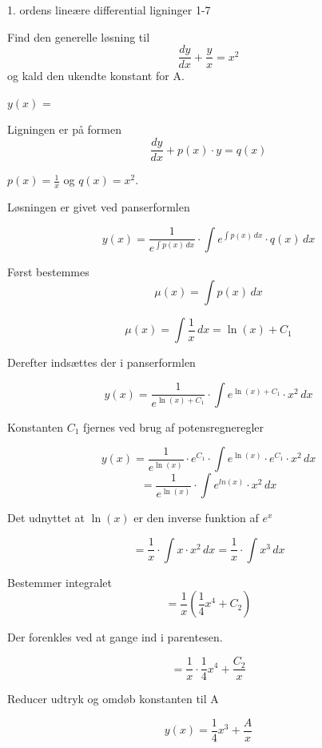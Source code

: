 \documentclass{article}
\begin{document}
\begin{exercise}{1. ordens lineære differential ligninger 1-7}
	
	
	Find den generelle løsning til
	\[
	\frac{dy}{dx} +  \frac{y}{x} = x^2
	\]
	og kald den ukendte konstant for A.
	
	$y(x)$ =   
	
	
	
	\hint
	
	Ligningen er på formen
	\[
	\frac{dy}{dx} + p(x) \cdot y = q(x)
	\]
	
	\hint
	
	$p(x)=\frac{1}{x}$ og $q(x)=x^2$.
	
	\hint
	
	Løsningen er givet ved panserformlen
	
	
	\hint
	
	\[
	y(x) = \frac{1}{e^{\int p(x) \, dx}} \cdot \int e^{\int p(x) \, dx}  \cdot q(x) \, dx
	\]
	
	\hint
	
	Først bestemmes 
	\[
	\mu(x) = \int p(x) \, dx
	\]
	
	\hint
	\[
	\mu(x) = \int \frac{1}{x} \, dx = \ln(x)+ C_1
	\]
	
	\hint
	Derefter indsættes der i  panserformlen
	
	\hint
	
	\[
	y(x) = \frac{1}{e^{\ln(x) + C_1}} \cdot \int e^{\ln(x) + C_1}  \cdot x^2 \, dx
	\]
	
	
	\hint
	
	Konstanten $C_1$ fjernes ved brug af potensregneregler
	
	\hint
	\[
	y(x) = \frac{1}{e^{\ln(x)}} \cdot e^{C_1} \cdot \int e^{\ln(x)} \cdot e^{C_1}  \cdot x^2 \, dx 
	\]
	\[
	= \frac{1}{e^{\ln(x)}} \cdot \int e^{ln(x)}  \cdot x^2 \, dx
	\]
	
	\hint
	
	Det udnyttet at $\ln(x)$ er den inverse funktion af $e^x$
	
	
	\hint
	\[
	= \frac{1}{x} \cdot \int x  \cdot x^2 \, dx =  \frac{1}{x} \cdot \int  x^3 \, dx
	\]
	
	\hint
	
	Bestemmer integralet
	\[
	= \frac{1}{x} \left( \frac{1}{4}x^4 + C_2    \right)
	\]
	
	\hint
	
	Der forenkles ved at gange ind i parentesen.
	
	\hint
	\[
	= \frac{1}{x} \cdot \frac{1}{4}x^4 + \frac{C_2}{x} 
	\]
	
	\hint
	
	Reducer udtryk og omdøb konstanten til A
	
	\hint
	\[
	y(x) =  \frac{1}{4}x^3 + \frac{A}{x}
	\]
	
	
\end{exercise}
\end{document}
